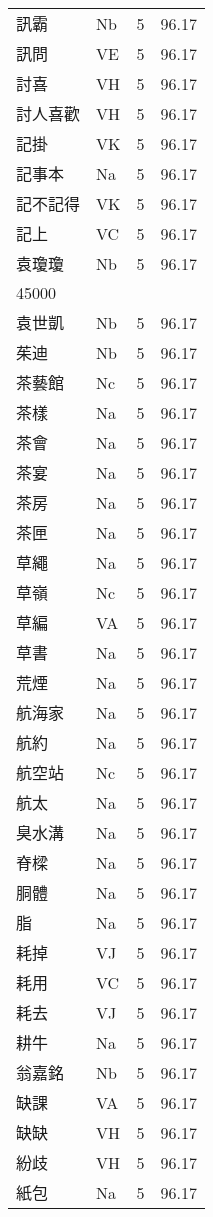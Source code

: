 \documentclass[twocolumn]{book}
\begin{document}
\begin{supertabular}{llrr}
訊霸 & Nb & 5 &  96.17\\
訊問 & VE & 5 &  96.17\\
討喜 & VH & 5 &  96.17\\
討人喜歡 & VH & 5 &  96.17\\
記掛 & VK & 5 &  96.17\\
記事本 & Na & 5 &  96.17\\
記不記得 & VK & 5 &  96.17\\
記上 & VC & 5 &  96.17\\
袁瓊瓊 & Nb & 5 &  96.17\\
45000\\
袁世凱 & Nb & 5 &  96.17\\
茱迪 & Nb & 5 &  96.17\\
茶藝館 & Nc & 5 &  96.17\\
茶樣 & Na & 5 &  96.17\\
茶會 & Na & 5 &  96.17\\
茶宴 & Na & 5 &  96.17\\
茶房 & Na & 5 &  96.17\\
茶匣 & Na & 5 &  96.17\\
草繩 & Na & 5 &  96.17\\
草嶺 & Nc & 5 &  96.17\\
草編 & VA & 5 &  96.17\\
草書 & Na & 5 &  96.17\\
荒煙 & Na & 5 &  96.17\\
航海家 & Na & 5 &  96.17\\
航約 & Na & 5 &  96.17\\
航空站 & Nc & 5 &  96.17\\
航太 & Na & 5 &  96.17\\
臭水溝 & Na & 5 &  96.17\\
脊樑 & Na & 5 &  96.17\\
胴體 & Na & 5 &  96.17\\
脂 & Na & 5 &  96.17\\
耗掉 & VJ & 5 &  96.17\\
耗用 & VC & 5 &  96.17\\
耗去 & VJ & 5 &  96.17\\
耕牛 & Na & 5 &  96.17\\
翁嘉銘 & Nb & 5 &  96.17\\
缺課 & VA & 5 &  96.17\\
缺缺 & VH & 5 &  96.17\\
紛歧 & VH & 5 &  96.17\\
紙包 & Na & 5 &  96.17\\

\end{supertabular}
\end{document}
